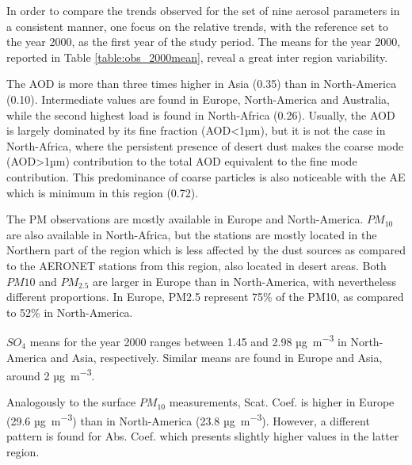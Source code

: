 \documentclass[journal abbreviation, manuscript]{copernicus}
\begin{document}
In order to compare the trends observed for the set of nine aerosol parameters in a consistent manner, one focus on the relative trends, with the reference set to the year 2000, as the first year of the study period. The means for the year 2000, reported in Table \ref{table:obs_2000mean}, reveal a great inter region variability.

The AOD is more than three times higher in Asia (0.35) than in North-America (0.10). Intermediate values are found in Europe, North-America and Australia, while the second highest load is found in North-Africa (0.26). Usually, the AOD is largely dominated by its fine fraction (AOD<1µm), but it is not the case in North-Africa, where the persistent presence of desert dust makes the coarse mode (AOD>1µm) contribution to the total AOD equivalent to the fine mode contribution. This predominance of coarse particles is also noticeable with the AE which is minimum in this region (0.72).

The PM observations are mostly available in Europe and North-America. $PM_{10}$ are also available in North-Africa, but the stations are mostly located in the Northern part of the region which is less affected by the dust sources as compared to the AERONET stations from this region, also located in desert areas. Both $PM{10}$ and $PM_{2.5}$ are larger in Europe than in North-America, with nevertheless different proportions. In Europe, PM2.5 represent 75\% of the PM10, as compared to 52\% in North-America.

$SO_{4}$ means for the year 2000 ranges between 1.45 and 2.98 \unit{µg.m^{-3}} in North-America and Asia, respectively. Similar means are found in Europe and Asia, around 2 \unit{µg.m^{-3}}.

Analogously to the surface $PM_{10}$ measurements, Scat. Coef. is higher in Europe (29.6 \unit{µg.m^{-3}}) than in North-America (23.8 \unit{µg.m^{-3}}). However, a different pattern is found for Abs. Coef. which presents slightly higher values in the latter region.
\end{document}
